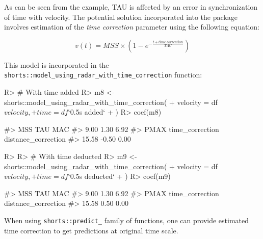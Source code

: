 \documentclass[
]{jss}
\begin{document}
As can be seen from the example, TAU is affected by an error in synchronization of time with velocity. The potential solution incorporated into the  package involves estimation of the \emph{time correction} parameter using the following equation:

\begin{equation}
  v(t) = MSS \times (1 - e^{-\frac{t + time \; correction}{TAU}}) \label{eq:velocity-time-correction}
\end{equation}

This model is incorporated in the \texttt{shorts::model\_using\_radar\_with\_time\_correction} function:

\begin{CodeChunk}
\begin{CodeInput}
R> # With time added
R> m8 <- shorts::model_using_radar_with_time_correction(
+   velocity = df$velocity,
+   time = df$`0.5s added`
+ )
R> coef(m8)
\end{CodeInput}
\begin{CodeOutput}
#>                 MSS                 TAU                 MAC 
#>                9.00                1.30                6.92 
#>                PMAX     time_correction distance_correction 
#>               15.58               -0.50                0.00
\end{CodeOutput}
\begin{CodeInput}
R> 
R> # With time deducted
R> m9 <- shorts::model_using_radar_with_time_correction(
+   velocity = df$velocity,
+   time = df$`0.5s deducted`
+ )
R> coef(m9)
\end{CodeInput}
\begin{CodeOutput}
#>                 MSS                 TAU                 MAC 
#>                9.00                1.30                6.92 
#>                PMAX     time_correction distance_correction 
#>               15.58                0.50                0.00
\end{CodeOutput}
\end{CodeChunk}

When using \texttt{shorts::predict\_} family of functions, one can provide estimated time correction to get predictions at original time scale.
\end{document}
